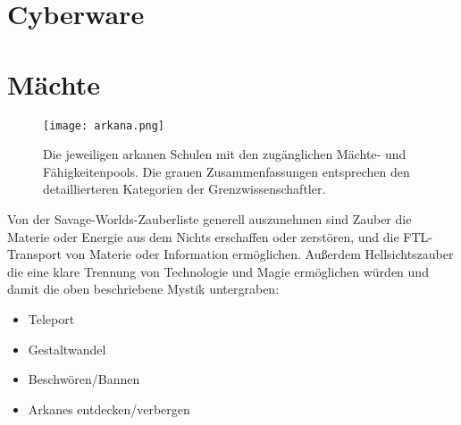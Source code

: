 \documentclass[10pt,a4paper]{report}
\begin{document}
\section{Cyberware}

\section{Mächte}
\begin{figure}[h!]
\centering
\texttt{[image: arkana.png]}
\caption{Die jeweiligen arkanen Schulen mit den zugänglichen Mächte- und Fähigkeitenpools. Die grauen Zusammenfassungen entsprechen den detaillierteren Kategorien der Grenzwissenschaftler.}
\end{figure}

Von der Savage-Worlds-Zauberliste generell auszunehmen sind Zauber die Materie oder Energie aus dem Nichts erschaffen oder zerstören, und die FTL-Transport von Materie oder Information ermöglichen. Außerdem Hellsichtszauber die eine klare Trennung von Technologie und Magie ermöglichen würden und damit die oben beschriebene Mystik untergraben:
\begin{itemize}
\item Teleport
\item Gestaltwandel
\item Beschwören/Bannen
\item Arkanes entdecken/verbergen
\end{itemize}
\end{document}
